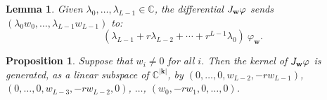 \documentclass[10pt,a4paper]{amsart}
\newtheorem{lem}{Lemma}
\newtheorem{prop}{Proposition}
\begin{document}
\begin{lem}\label{lemm:homogendiff}
Given $\lambda_0, \ldots, \lambda_{L-1} \in \mathbb{C}$, the differential $\textnormal{J}_\mathbf{w} \varphi$ sends $(\lambda_{0}w_{0}, \ldots, \lambda_{L-1} w_{L-1})$ to:
\begin{equation}
    (\lambda_{L-1} + r \lambda_{L-2} + \cdots + r^{L-1}\lambda_0) \ \varphi_\mathbf{w}. 
\end{equation}
\end{lem}

\begin{prop}\label{prop:kerdiff}
Suppose that $w_i \not = 0 $ for all $i$. Then the kernel of $\textnormal{J}_\mathbf{w} \varphi$ is generated, as a linear subspace of $\mathbb{C}^{|\mathbf{k}|}$, by $(0,\ldots,   0, w_{L-2}, -rw_{L-1})$, $(0, \ldots, 0, w_{L-3}, -rw_{L-2},0)$, $\ldots$, $(w_0, -rw_1, 0, \ldots, 0)$. 
\end{prop}
\end{document}
